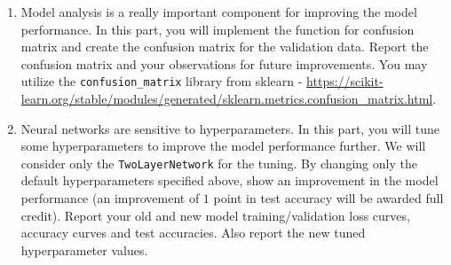 \begin{enumerate}
\item {}
Model analysis is a really important component for improving the model performance. In this part, you will implement the function for confusion matrix and create the confusion matrix for the validation data. Report the confusion matrix and your observations for future improvements. You may utilize the \verb|confusion_matrix| library from sklearn - \url{https://scikit-learn.org/stable/modules/generated/sklearn.metrics.confusion_matrix.html}.


\item {}
Neural networks are sensitive to hyperparameters. In this part, you will tune some hyperparameters to improve the model performance further. We will consider only the \verb|TwoLayerNetwork| for the tuning. By changing only the default hyperparameters specified above, show an improvement in the model performance (an improvement of $1$ point in test accuracy will be awarded full credit). Report your old and new model training/validation loss curves, accuracy curves and test accuracies. Also report the new tuned hyperparameter values. 

\end{enumerate}
